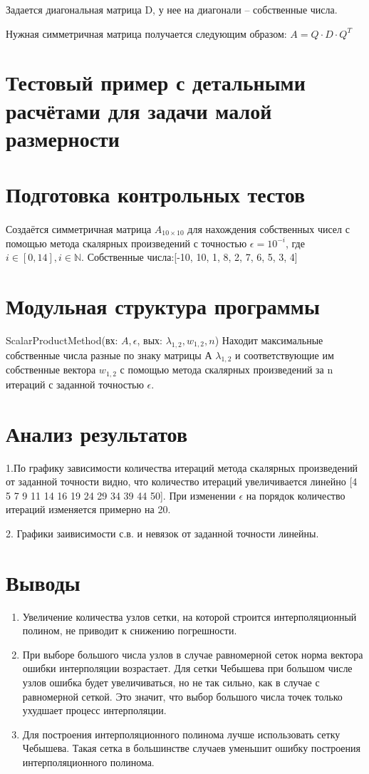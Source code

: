 \documentclass{article}
\begin{document}
	Задается диагональная матрица D, у нее на диагонали – собственные числа. 
	
	Нужная симметричная матрица получается следующим образом:
	$A = Q \cdot D \cdot Q^T$
	
	\section{Тестовый пример с детальными расчётами для задачи малой размерности}
	
	\section{Подготовка контрольных тестов}
	\paragraph{}Создаётся симметричная матрица  $A_{10 \times 10}$  для нахождения собственных чисел с помощью метода скалярных произведений с точностью  $\epsilon=10^{-i}$, где $i \in [0, 14], i \in \mathbb {N} $. 
	Собственные числа:[-10, 10, 1, 8, 2, 7, 6, 5, 3, 4]
	
	\section{Модульная структура программы}
	ScalarProductMethod(вх: $A, \epsilon$, вых: $\lambda_{1,2}, w_{1,2}, n$) Находит  максимальные собственные числа разные по знаку матрицы А  $\lambda_{1,2}$ и соответствующие им собственные вектора $w_{1,2}$ с помощью метода скалярных произведений за n итераций с заданной точностью $\epsilon$.
	
	
	\section{Анализ результатов}
	1.По графику зависимости количества итераций метода скалярных произведений от заданной точности видно, что количество итераций увеличивается линейно [4 5 7 9 11 14 16 19 24 29 34 39 44 50].
	При изменении $\epsilon$ на порядок количество итераций изменяется примерно на 20. 
	
	2. Графики заивисимости с.в. и невязок от заданной точности линейны.
	
	
	\section{Выводы}
	\begin{enumerate}
	\item Увеличение количества узлов сетки, на которой строится интерполяционный полином, не приводит к снижению погрешности. 
	\item При выборе большого числа узлов в случае равномерной сеток норма вектора ошибки интерполяции возрастает. Для сетки Чебышева при большом числе узлов ошибка будет увеличиваться, но не так сильно, как в случае с равномерной сеткой. Это значит, что выбор большого числа точек только ухудшает процесс интерполяции. 
	\item Для построения интерполяционного полинома лучше использовать сетку Чебышева. Такая сетка в большинстве случаев уменьшит ошибку построения интерполяционного полинома.
	\end{enumerate}
	
\end{document}
